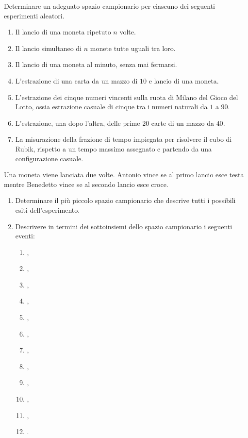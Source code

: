 
\ParteEsercizi

\Esercizio{}

Determinare un adeguato spazio campionario per ciascuno dei seguenti esperimenti aleatori.
\begin{enumerate}
	\item Il lancio di una moneta ripetuto $n$ volte.
	\item Il lancio simultaneo di $n$ monete tutte uguali tra loro.
	\item Il lancio di una moneta al minuto, senza mai fermarsi.
	\item L'estrazione di una carta da un mazzo di $10$ e lancio di una moneta.
	\item L'estrazione dei cinque numeri vincenti sulla ruota di Milano del Gioco del Lotto, ossia estrazione casuale di cinque tra i numeri naturali da $1$ a $90$.
	\item L'estrazione, una dopo l'altra, delle prime $20$ carte di un mazzo da $40$.
	\item La misurazione della frazione di tempo impiegata per risolvere il cubo di Rubik, rispetto a un tempo massimo assegnato e partendo da una configurazione casuale.
\end{enumerate}

\Esercizio{}

Una moneta viene lanciata due volte. Antonio vince se al primo lancio esce testa mentre Benedetto vince se al secondo lancio esce croce.
\begin{enumerate}
	\item Determinare il più piccolo spazio campionario che descrive tutti i possibili esiti dell'esperimento.
	\item Descrivere in termini dei sottoinsiemi dello spazio campionario i seguenti eventi:
	\begin{enumerate}
		\item {},
		\item {},
		\item {},
		\item {},
		\item {},
		\item {},
		\item {},
		\item {},
		\item {},
		\item {},
		\item {},
		\item {}.
	\end{enumerate}
\end{enumerate}

